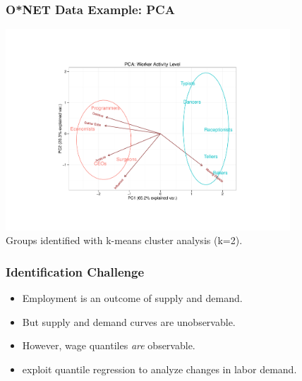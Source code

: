\documentclass[red]{beamer}
\begin{document}
\begin{frame}
  \frametitle{O*NET Data Example: PCA}
  \begin{center}
  \includegraphics[width=0.8\textwidth]{slides_fig/pca_example.pdf} \\
  Groups identified with k-means cluster analysis (k=2).
  \end{center}
\end{frame}

\begin{frame}
  \frametitle{Identification Challenge}
  \begin{itemize}
  \item Employment is an outcome of supply and demand.
  \item But supply and demand curves are unobservable.
  \item However, wage quantiles {\em are} observable. 
  \item \citet{Firpo2011} exploit quantile regression to analyze changes in labor demand.
  \end{itemize}
\end{frame}
\end{document}
